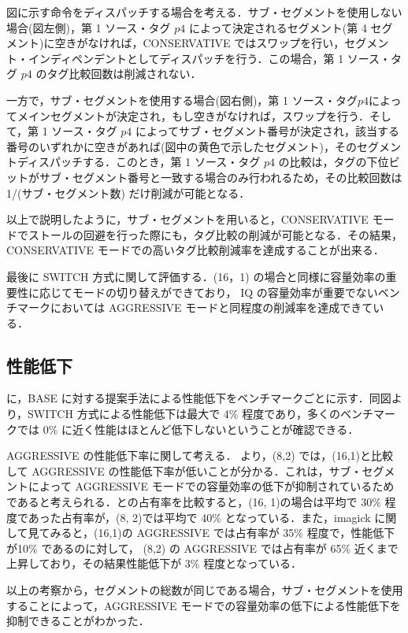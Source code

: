 図に示す命令をディスパッチする場合を考える．サブ・セグメントを使用しない場合(図左側)，第 1 ソース・タグ $p4$ によって決定されるセグメント(第 4 セグメント)に空きがなければ，CONSERVATIVE ではスワップを行い，セグメント・インディペンデントとしてディスパッチを行う．この場合，第 1 ソース・タグ $p4$ のタグ比較回数は削減されない．

一方で，サブ・セグメントを使用する場合(図右側)，第 1 ソース・タグ$p4$によってメインセグメントが決定され，もし空きがなければ，スワップを行う．そして，第 1 ソース・タグ $p4$ によってサブ・セグメント番号が決定され，該当する番号のいずれかに空きがあれば(図中の黄色で示したセグメント)，そのセグメントディスパッチする．このとき，第 1 ソース・タグ $p4$ の比較は，タグの下位ビットがサブ・セグメント番号と一致する場合のみ行われるため，その比較回数は1/(サブ・セグメント数) だけ削減が可能となる．

以上で説明したように，サブ・セグメントを用いると，CONSERVATIVE モードでストールの回避を行った際にも，タグ比較の削減が可能となる．その結果，CONSERVATIVE モードでの高いタグ比較削減率を達成することが出来る．

最後に SWITCH 方式に関して評価する．(16，1) の場合と同様に容量効率の重要性に応じてモードの切り替えができており， IQ の容量効率が重要でないベンチマークにおいては AGGRESSIVE モードと同程度の削減率を達成できている．

\subsection{性能低下}
に，BASE に対する提案手法による性能低下をベンチマークごとに示す．同図より，SWITCH 方式による性能低下は最大で 4\% 程度であり，多くのベンチマークでは 0\% に近く性能はほとんど低下しないということが確認できる．

AGGRESSIVE の性能低下率に関して考える． より，(8,2) では，(16,1)と比較して AGGRESSIVE の性能低下率が低いことが分かる．これは，サブ・セグメントによって AGGRESSIVE モードでの容量効率の低下が抑制されているためであると考えられる．との占有率を比較すると，(16, 1)の場合は平均で 30\% 程度であった占有率が，(8, 2)では平均で 40\% となっている．また，imagick に関して見てみると，(16,1)の AGGRESSIVE では占有率が 35\% 程度で，性能低下が10\% であるのに対して， (8,2) の AGGRESSIVE では占有率が 65\% 近くまで上昇しており，その結果性能低下が 3\% 程度となっている．

以上の考察から，セグメントの総数が同じである場合，サブ・セグメントを使用することによって，AGGRESSIVE モードでの容量効率の低下による性能低下を抑制できることがわかった．

